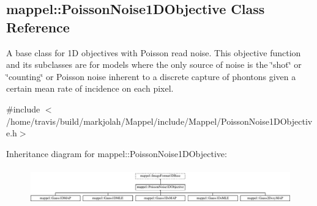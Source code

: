 \hypertarget{classmappel_1_1PoissonNoise1DObjective}{}\subsection{mappel\+:\+:Poisson\+Noise1\+D\+Objective Class Reference}
\label{classmappel_1_1PoissonNoise1DObjective}


A base class for 1D objectives with Poisson read noise. This objective function and its subclasses are for models where the only source of noise is the \char`\"{}shot\char`\"{} or \char`\"{}counting\char`\"{} or Poisson noise inherent to a discrete capture of phontons given a certain mean rate of incidence on each pixel.  




{\ttfamily \#include $<$/home/travis/build/markjolah/\+Mappel/include/\+Mappel/\+Poisson\+Noise1\+D\+Objective.\+h$>$}

Inheritance diagram for mappel\+:\+:Poisson\+Noise1\+D\+Objective\+:\begin{figure}[H]
\begin{center}
\leavevmode
\includegraphics[height=1.584906cm]{classmappel_1_1PoissonNoise1DObjective}
\end{center}
\end{figure}
